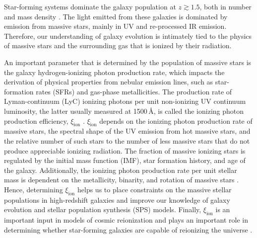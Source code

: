 \documentclass[iop]{emulateapj}
\newcommand{\xiion}{\ensuremath{\xi_{\mathrm{ion}}}}
\begin{document}
Star-forming systems dominate the galaxy population at $z\gtrsim 1.5$, both in number and mass density \citep{madau14}. The light emitted from these galaxies is dominated by emission from massive stars, mainly in UV and re-processed IR emission.
Therefore, our understanding of galaxy evolution is intimately tied to the physics of massive stars and the surrounding gas that is ionized by their radiation.

An important parameter that is determined by the population of massive stars is the galaxy hydrogen-ionizing photon production rate, which impacts the derivation of physical properties from nebular emission lines, such as star-formation rates (SFRs) and gas-phase metallicities. The production rate of Lyman-continuum (LyC) ionizing photons per unit non-ionizing UV continuum luminosity, the latter usually measured at 1500\,\AA, is called the ionizing photon production efficiency, {\xiion} \citep[e.g.,][]{robertson13}.
{\xiion} depends on the ionizing photon production rate of massive stars, the spectral shape of the UV emission from hot massive stars, and the relative number of such stars to the number of less massive stars that do not produce appreciable ionizing radiation.
The fraction of massive ionizing stars is regulated by the initial mass function (IMF), star formation history, and age of the galaxy. 
Additionally, the ionizing photon production rate per unit stellar mass is dependent on the metallicity, binarity, and rotation of massive stars \citep[e.g.,][]{stanway16,choi17}. Hence, determining {\xiion} helps us to place constraints on the massive stellar populations in high-redshift galaxies and improve our knowledge of galaxy evolution and stellar population synthesis (SPS) models. Finally, {\xiion} is an important input in models of cosmic reionization and plays an important role in determining whether star-forming galaxies are capable of reionizing the universe \citep[e.g.,][]{bouwens15b,robertson15}.
\end{document}
